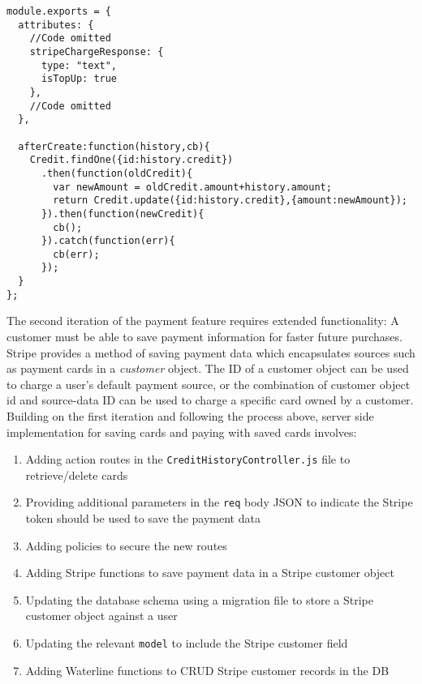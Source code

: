 \begin{listing}[H]
\begin{verbatim}
module.exports = {
  attributes: {
    //Code omitted
    stripeChargeResponse: {
      type: "text",
      isTopUp: true
    },
    //Code omitted
  },

  afterCreate:function(history,cb){
    Credit.findOne({id:history.credit})
      .then(function(oldCredit){
        var newAmount = oldCredit.amount+history.amount;
        return Credit.update({id:history.credit},{amount:newAmount});
      }).then(function(newCredit){
        cb();
      }).catch(function(err){
        cb(err);
      });
  }
};

\end{verbatim}
\label{lst:credit-history-model}
\end{listing}

The second iteration of the payment feature requires extended functionality: A customer must be able to save payment information for faster future purchases. Stripe provides a method of saving payment data which encapsulates sources such as payment cards in a \textit{customer} object. The ID of a customer object can be used to charge a user's default payment source, or the combination of customer object id and source-data ID can be used to charge a specific card owned by a customer. Building on the first iteration and following the process above, server side implementation for saving cards and paying with saved cards involves:

\begin{enumerate}
	\item Adding action routes in the \texttt{CreditHistoryController.js} file to retrieve/delete cards
    \item Providing additional parameters in the \texttt{req} body JSON to indicate the Stripe token should be used to save the payment data
    \item Adding policies to secure the new routes
    \item Adding Stripe functions to save payment data in a Stripe customer object
    \item Updating the database schema using a migration file to store a Stripe customer object against a user
    \item Updating the relevant \texttt{model} to include the Stripe customer field
    \item Adding Waterline functions to CRUD Stripe customer records in the DB
\end{enumerate}

